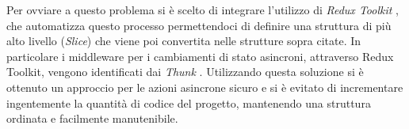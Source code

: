 \noindent Per ovviare a questo problema si è scelto di integrare l'utilizzo di \emph{Redux Toolkit} \cite{toolkit_redux}, che automatizza questo processo permettendoci di definire una struttura di più alto livello (\emph{Slice}) che viene poi convertita nelle strutture sopra citate.\newline
In particolare i middleware per i cambiamenti di stato asincroni, attraverso Redux Toolkit, vengono identificati dai \emph{Thunk} \cite{thunk_redux}.\newline
Utilizzando questa soluzione si è ottenuto un approccio per le azioni asincrone sicuro e si è evitato di incrementare ingentemente la quantità di codice del progetto, mantenendo una struttura ordinata e facilmente manutenibile.
